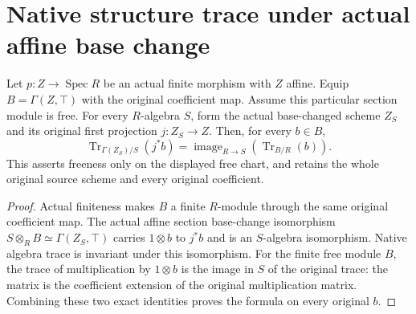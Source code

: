 \section{Native structure trace under actual affine base change}

\begin{lemma}
\label{lem:kn-structure-trace-affine-base-change}
\leanok
Let $p:Z\to\operatorname{Spec}R$ be an actual finite morphism with
$Z$ affine. Equip $B=\Gamma(Z,\top)$ with the original coefficient
map. Assume this particular section module is free. For every
$R$-algebra $S$, form the actual base-changed scheme $Z_S$ and its
original first projection $j:Z_S\to Z$. Then, for every $b\in B$,
\[
 \operatorname{Tr}_{\Gamma(Z_S)/S}(j^*b)
   =\operatorname{image}_{R\to S}(\operatorname{Tr}_{B/R}(b)).
\]
This asserts freeness only on the displayed free chart, and retains
the whole original source scheme and every original coefficient.
\end{lemma}
\begin{proof}
Actual finiteness makes $B$ a finite $R$-module through the same
original coefficient map. The actual affine section base-change
isomorphism $S\otimes_RB\simeq\Gamma(Z_S,\top)$ carries $1\otimes b$
to $j^*b$ and is an $S$-algebra isomorphism. Native algebra trace is
invariant under this isomorphism. For the finite free module $B$,
the trace of multiplication by $1\otimes b$ is the image in $S$ of
the original trace: the matrix is the coefficient extension of the
original multiplication matrix. Combining these two exact identities
proves the formula on every original $b$.
\end{proof}
